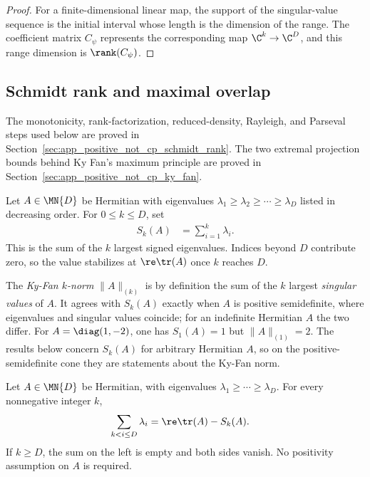 \begin{proof}
    \leanok
    For a finite-dimensional linear map, the support of the singular-value
    sequence is the initial interval whose length is the dimension of the
    range. The coefficient matrix $C_\psi$ represents the corresponding map
    $\C^k\to\C^D$, and this range dimension is $\rank(C_\psi)$.
\end{proof}

\subsection{Schmidt rank and maximal overlap}

The monotonicity, rank-factorization, reduced-density, Rayleigh, and Parseval
steps used below are proved in
Section~\ref{sec:app_positive_not_cp_schmidt_rank}. The two extremal
projection bounds behind Ky Fan's maximum principle are proved in
Section~\ref{sec:app_positive_not_cp_ky_fan}.


\begin{definition}
    \label{def:ky_fan_norm}
    \leanok
    Let $A\in\MN{D}$ be Hermitian with eigenvalues
    $\lambda_1\ge\lambda_2\ge\cdots\ge\lambda_D$ listed in decreasing order.
    For $0\le k\le D$, set
    \begin{align}
        S_k(A)
         & =\sum_{i=1}^{k}\lambda_i.
        \label{eq:channel_largest_eigenvalue_sum}
    \end{align}
    This is the sum of the $k$ largest signed eigenvalues. Indices beyond $D$
    contribute zero, so the value stabilizes at $\re\tr(A)$ once $k$ reaches
    $D$.

    The \emph{Ky-Fan $k$-norm} $\|A\|_{(k)}$ is by definition the sum of the
    $k$ largest \emph{singular values} of $A$. It agrees with $S_k(A)$ exactly
    when $A$ is positive semidefinite, where eigenvalues and singular values
    coincide; for an indefinite Hermitian $A$ the two differ. For
    $A=\diag(1,-2)$, one has $S_1(A)=1$ but $\|A\|_{(1)}=2$. The results below
    concern $S_k(A)$ for arbitrary Hermitian $A$, so on the
    positive-semidefinite cone they are statements about the Ky-Fan norm.
\end{definition}

\begin{theorem}
    \label{thm:ky_fan_eigenvalue_tail}
    \leanok
    Let $A\in\MN{D}$ be Hermitian, with eigenvalues
    $\lambda_1\ge\cdots\ge\lambda_D$. For every nonnegative integer $k$,
    \begin{align}
        \sum_{k<i\le D}\lambda_i
         & =\re\tr(A)-S_k(A).
        \label{eq:ky_fan_eigenvalue_tail}
    \end{align}
    If $k\ge D$, the sum on the left is empty and both sides vanish.
    No positivity assumption on $A$ is required.
\end{theorem}

